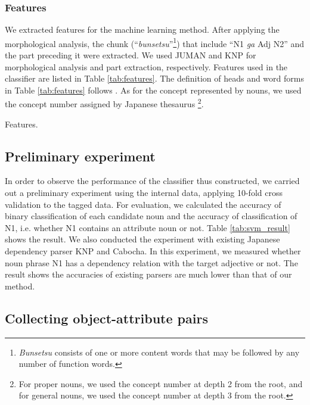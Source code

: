 \documentclass[english]{jnlp_1.4}
\begin{document}
\subsubsection{Features}

We extracted features for the machine learning method.  After applying
the morphological analysis, the chunk (``{\it bunsetsu}''\footnote{ {\it
Bunsetsu} consists of one or more content words that may be followed by
any number of function words.})  that include ``N1 {\it ga} Adj N2'' and
the part preceding it were extracted.  We used
JUMAN\cite{kurohasi:98:ae} and KNP\cite{kurohasi:94:b} for morphological
analysis and part extraction, respectively. Features used in the
classifier are listed in Table \ref{tab:features}. The definition of
heads and word forms in Table \ref{tab:features} follows
\cite{utimoto:2000e}. As for the concept represented by nouns, we used
the concept number assigned by Japanese thesaurus
\cite{ikehara:1997e}\footnote{For proper nouns, we used the concept
number at depth 2 from the root, and for general nouns, we used the
concept number at depth 3 from the root.}.

\begin{table}[b]
  \caption{Features.}
  \label{tab:features}

\end{table}



\subsection{Preliminary experiment}

In order to observe the performance of the classifier thus constructed, 
we carried out a preliminary experiment using the internal data, applying
10-fold cross validation to the tagged data. For evaluation, we calculated 
the accuracy of binary classification of each candidate noun and the
accuracy of classification of N1, i.e. whether N1 contains an attribute
noun or not. Table \ref{tab:svm_result} shows the result. We also
conducted the experiment with existing Japanese dependency parser KNP
and Cabocha\cite{kudo:2002e}. In this experiment, we measured whether
noun phrase N1 has a dependency relation with the target adjective or
not. The result shows the accuracies of existing parsers are much lower
than that of our method.


\subsection{Collecting object-attribute pairs}
\end{document}

